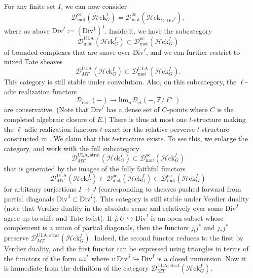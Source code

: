 \documentclass[11pt]{amsart}
\numberwithin{equation}{section}
\numberwithin{theorem}{section}
\theoremstyle{definition}
\newcommand{\Hloc}{{\mathcal H}{\mathrm{ck}}}
\begin{document}
For any finite set $I$, we can now consider
\[
\mathcal D_{\mathrm{mot}}^{\mathrm{oc}}(\Hloc_G^I) = \mathcal D_{\mathrm{mot}}^{\mathrm{oc}}(\Hloc_{G,\mathrm{Div}^I}),
\]
where as above $\mathrm{Div}^I := (\mathrm{Div}^1)^I$. Inside it, we have the subcategory
\[
\mathcal D_{\mathrm{mot}}^{\mathrm{ULA}}(\Hloc_G^I)\subset \mathcal D_{\mathrm{mot}}^{\mathrm{oc}}(\Hloc_G^I)
\]
of bounded complexes that are suave over $\mathrm{Div}^I$, and we can further restrict to mixed Tate sheaves
\[
\mathcal D_{MT}^{\mathrm{ULA}}(\Hloc_G^I)\subset \mathcal D_{\mathrm{mot}}^{\mathrm{ULA}}(\Hloc_G^I).
\]
This category is still stable under convolution. Also, on this subcategory, the $\ell$-adic realization functors
\[
\mathcal D_{\mathrm{mot}}(-)\to \mathrm{lim}_n \mathcal D_{\mathrm{et}}(-,\mathbb Z/\ell^n)
\]
are conservative. (Note that $\mathrm{Div}^I$ has a dense set of $C$-points where $C$ is the completed algebraic closure of $E$.) There is thus at most one $t$-structure making the $\ell$-adic realization functors $t$-exact for the relative perverse $t$-structure constructed in \cite{FarguesScholze}. We claim that this $t$-structure exists. To see this, we enlarge the category, and work with the full subcategory
\[
\mathcal D_{MT}^{\mathrm{ULA},\mathrm{strat}}(\Hloc_G^I)\subset \mathcal D_{\mathrm{mot}}^{\mathrm{oc}}(\Hloc_G^I)
\]
that is generated by the images of the fully faithful functors
\[
\mathcal D_{MT}^{\mathrm{ULA}}(\Hloc_G^J)\subset \mathcal D_{\mathrm{mot}}^{\mathrm{oc}}(\Hloc_G^J)\subset \mathcal D_{\mathrm{mot}}^{\mathrm{oc}}(\Hloc_G^I)
\]
for arbitrary surjections $I\to J$ (corresponding to sheaves pushed forward from partial diagonals $\mathrm{Div}^J\subset \mathrm{Div}^I$). This category is still stable under Verdier duality (note that Verdier duality in the absolute sense and relatively over some $\mathrm{Div}^I$ agree up to shift and Tate twist). If $j: U\hookrightarrow \mathrm{Div}^I$ is an open subset whose complement is a union of partial diagonals, then the functors $j_! j^\ast$ and $j_\ast j^\ast$ preserve $\mathcal D_{MT}^{\mathrm{ULA},\mathrm{strat}}(\Hloc_G^I)$. Indeed, the second functor reduces to the first by Verdier duality, and the first functor can be expressed using triangles in terms of the functors of the form $i_\ast i^\ast$ where $i: \mathrm{Div}^J\hookrightarrow \mathrm{Div}^I$ is a closed immersion. Now it is immediate from the definition of the category $\mathcal D_{MT}^{\mathrm{ULA},\mathrm{strat}}(\Hloc_G^I)$.
\end{document}
